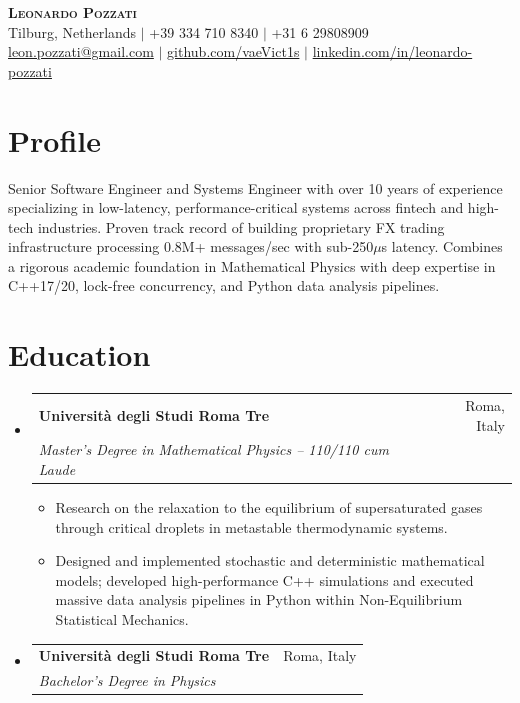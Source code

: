 \documentclass[letterpaper,10pt]{article}
\makeatletter
\newcommand{\resumeItem}[1]{
  \item\small{
    {#1 \vspace{-2pt}}
  }
}
\newcommand{\resumeSubheading}[4]{
  \vspace{-1pt}\item
    \begin{tabular*}{0.97\textwidth}[t]{l@{\extracolsep{\fill}}r}
      \textbf{#1} & #2 \\
      \textit{\small#3} & \textit{\small #4} \\
    \end{tabular*}\vspace{-5pt}
}
\makeatother
\begin{document}
\begin{center}
    \textbf{\Huge \scshape Leonardo Pozzati} \\ \vspace{4pt}
    \small Tilburg, Netherlands $|$ +39 334 710 8340 $|$ +31 6 29808909 \\ \vspace{2pt}
    \href{mailto:leon.pozzati@gmail.com}{leon.pozzati@gmail.com} $|$ 
    \href{https://github.com/vaeVict1s}{github.com/vaeVict1s} $|$ 
    \href{https://www.linkedin.com/in/leonardo-pozzati-4769471bb}{linkedin.com/in/leonardo-pozzati}
\end{center}

\section*{Profile}
\small{Senior Software Engineer and Systems Engineer with over 10 years 
of experience specializing in low-latency, performance-critical systems 
across fintech and high-tech industries. Proven track record of building 
proprietary FX trading infrastructure processing 0.8M+ messages/sec 
with sub-250$\mu$s latency. 
\newline
Combines a rigorous academic foundation in Mathematical Physics with 
deep expertise in C++17/20, lock-free concurrency, and Python data analysis pipelines.}

\section{Education}
  \begin{itemize}[leftmargin=0.15in, label={}]
    \resumeSubheading
      {Università degli Studi Roma Tre}{Roma, Italy}
      {Master's Degree in Mathematical Physics -- 110/110 cum Laude}{}
      \begin{itemize}[leftmargin=0.1in]
        \resumeItem{Research on the relaxation to the equilibrium of 
        supersaturated gases through critical droplets in metastable thermodynamic systems.}
        \resumeItem{Designed and implemented stochastic and deterministic 
        mathematical models; developed high-performance C++ simulations 
        and executed massive data analysis pipelines in Python within 
        Non-Equilibrium Statistical Mechanics.}
      \end{itemize}
    \resumeSubheading
      {Università degli Studi Roma Tre}{Roma, Italy}
      {Bachelor's Degree in Physics}{}
  \end{itemize}
\end{document}
